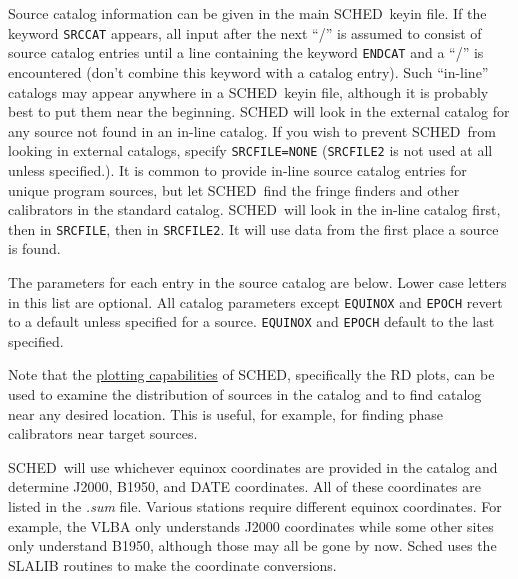 \documentclass{report}
\newcommand{\sched}{{\sc SCHED}}
\newcommand{\schedb}{{\sc SCHED~}}
\begin{document}
Source catalog information can be given in the main \schedb keyin
file. If the keyword {\tt SRCCAT} appears, all input after the next
``/'' is assumed to consist of source catalog entries until a line
 containing the keyword {\tt ENDCAT} and a ``/'' is encountered (don't
combine this keyword with a catalog entry).  Such ``in-line'' catalogs
may appear anywhere in a \schedb keyin file, although it is probably
best to put them near the beginning.  {\sc SCHED} will look in the
external catalog for any source not found in an in-line catalog.  If
you wish to prevent \schedb from looking in external catalogs, specify
{\tt SRCFILE=NONE} ({\tt SRCFILE2} is not used at all unless
specified.).  It is common to provide in-line source catalog entries
for unique program sources, but let \schedb find the fringe finders
and other calibrators in the standard catalog.  \schedb will look in
the in-line catalog first, then in {\tt SRCFILE}, then in {\tt SRCFILE2}.
It will use data from the first place a source is found.

The parameters for each entry in the source catalog are below.  Lower
case letters in this list are optional.  All catalog parameters except
{\tt EQUINOX} and {\tt EPOCH} revert to a default unless specified
for a source. {\tt EQUINOX} and {\tt EPOCH} default to the last specified.

Note that the 
{\hyperref[SEC:PLOT]{plotting capabilities}} of \sched,
specifically the RD plots, can be used to examine the distribution
of sources in the catalog and to find catalog near any desired
location.  This is useful, for example, for finding phase calibrators
near target sources.

\schedb will use whichever equinox coordinates are provided in the
catalog and determine J2000, B1950, and DATE coordinates.  All of
these coordinates are listed in the {\sl .sum} file.  Various stations
require different equinox coordinates.  For example, the VLBA only
understands J2000 coordinates while some other sites only understand
B1950, although those may all be gone by now.  Sched uses the SLALIB
routines to make the coordinate conversions.
\end{document}

